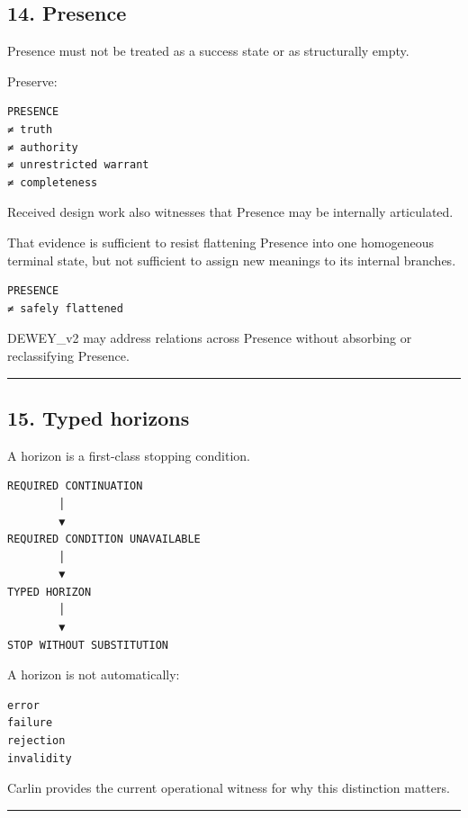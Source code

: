 \subsection{14. Presence}\label{presence}

Presence must not be treated as a success state or as structurally
empty.

Preserve:

\begin{verbatim}
PRESENCE
≠ truth
≠ authority
≠ unrestricted warrant
≠ completeness
\end{verbatim}

Received design work also witnesses that Presence may be internally
articulated.

That evidence is sufficient to resist flattening Presence into one
homogeneous terminal state, but not sufficient to assign new meanings to
its internal branches.

\begin{verbatim}
PRESENCE
≠ safely flattened
\end{verbatim}

DEWEY\_v2 may address relations across Presence without absorbing or
reclassifying Presence.

\begin{center}\rule{0.5\linewidth}{0.5pt}\end{center}

\subsection{15. Typed horizons}\label{typed-horizons}

A horizon is a first-class stopping condition.

\begin{verbatim}
REQUIRED CONTINUATION
        │
        ▼
REQUIRED CONDITION UNAVAILABLE
        │
        ▼
TYPED HORIZON
        │
        ▼
STOP WITHOUT SUBSTITUTION
\end{verbatim}

A horizon is not automatically:

\begin{verbatim}
error
failure
rejection
invalidity
\end{verbatim}

Carlin provides the current operational witness for why this distinction
matters.

\begin{center}\rule{0.5\linewidth}{0.5pt}\end{center}

